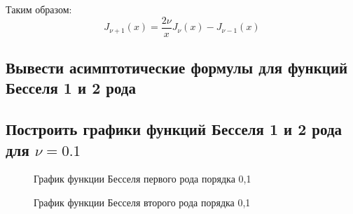 \documentclass[12pt, a4paper]{report}
\begin{document}
Таким образом:
\[  J_{\nu + 1}(x) = \frac{2\nu}{x} J_{\nu}(x) - J_{\nu - 1}(x) \]

\subsection{Вывести асимптотические формулы для функций Бесселя 1 и 2 рода}

\subsection{Построить графики функций Бесселя 1 и 2 рода для $\nu = 0.1$}
\begin{figure}[H]
	\caption{График функции Бесселя первого рода порядка 0,1}
\end{figure}

\begin{figure}[H]
	\caption{График функции Бесселя второго рода порядка 0,1}
\end{figure}
\end{document}
